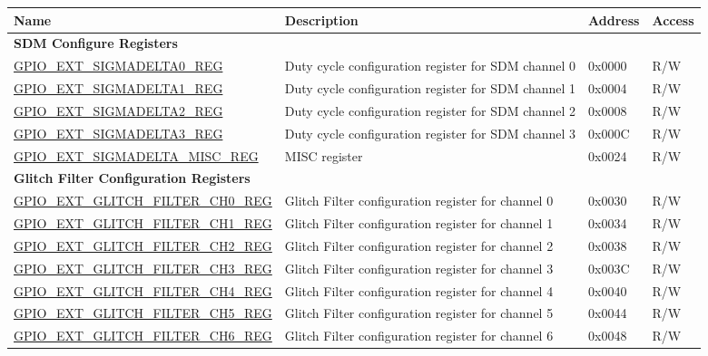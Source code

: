 
\begin{longtable}{ | p{6.2cm} | p{7.0cm} | p{1.3cm} | p{1cm} | }
\hline\rowcolor{lightgray}
\textbf{Name} & \textbf{Description} &  \textbf{Address} & \textbf{Access} \\ \hline
\endhead
\multicolumn{4}{|l|}{\textbf{SDM Configure Registers}} \\ \hline
\hyperref[regdesc:GPIOSDSIGMADELTANREG]{GPIO\_EXT\_SIGMADELTA0\_REG} & Duty cycle configuration register for SDM channel 0 & 0x0000 & R/W \\ \hline
\hyperref[regdesc:GPIOSDSIGMADELTANREG]{GPIO\_EXT\_SIGMADELTA1\_REG} & Duty cycle configuration register for SDM channel 1 & 0x0004 & R/W \\ \hline
\hyperref[regdesc:GPIOSDSIGMADELTANREG]{GPIO\_EXT\_SIGMADELTA2\_REG} & Duty cycle configuration register for SDM channel 2 & 0x0008 & R/W \\ \hline
\hyperref[regdesc:GPIOSDSIGMADELTANREG]{GPIO\_EXT\_SIGMADELTA3\_REG} & Duty cycle configuration register for SDM channel 3 & 0x000C & R/W \\ \hline
\hyperref[regdesc:GPIOSDSIGMADELTAMISCREG]{GPIO\_EXT\_SIGMADELTA\_MISC\_REG} & MISC register & 0x0024 & R/W \\ \hline
\multicolumn{4}{|l|}{\textbf{Glitch Filter Configuration Registers}} \\ \hline
\hyperref[regdesc:GPIOSDGLITCHFILTERCHNREG]{GPIO\_EXT\_GLITCH\_FILTER\_CH0\_REG} & Glitch Filter configuration register for channel 0 & 0x0030 & R/W \\ \hline
\hyperref[regdesc:GPIOSDGLITCHFILTERCHNREG]{GPIO\_EXT\_GLITCH\_FILTER\_CH1\_REG} & Glitch Filter configuration register for channel 1 & 0x0034 & R/W \\ \hline
\hyperref[regdesc:GPIOSDGLITCHFILTERCHNREG]{GPIO\_EXT\_GLITCH\_FILTER\_CH2\_REG} & Glitch Filter configuration register for channel 2 & 0x0038 & R/W \\ \hline
\hyperref[regdesc:GPIOSDGLITCHFILTERCHNREG]{GPIO\_EXT\_GLITCH\_FILTER\_CH3\_REG} & Glitch Filter configuration register for channel 3 & 0x003C & R/W \\ \hline
\hyperref[regdesc:GPIOSDGLITCHFILTERCHNREG]{GPIO\_EXT\_GLITCH\_FILTER\_CH4\_REG} & Glitch Filter configuration register for channel 4 & 0x0040 & R/W \\ \hline
\hyperref[regdesc:GPIOSDGLITCHFILTERCHNREG]{GPIO\_EXT\_GLITCH\_FILTER\_CH5\_REG} & Glitch Filter configuration register for channel 5 & 0x0044 & R/W \\ \hline
\hyperref[regdesc:GPIOSDGLITCHFILTERCHNREG]{GPIO\_EXT\_GLITCH\_FILTER\_CH6\_REG} & Glitch Filter configuration register for channel 6 & 0x0048 & R/W \\ \hline

\end{longtable}
